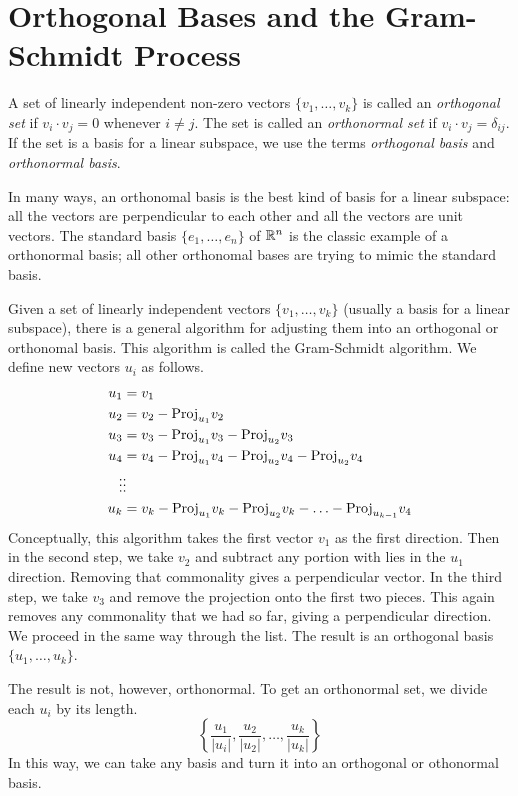 \documentclass[fleqn]{report}
\begin{document}
\section{Orthogonal Bases and the Gram-Schmidt Process}

\begin{defn}
A set of linearly independent non-zero vectors $\{ v_1,
\ldots, v_k\}$ is called an \emph{orthogonal set} if $v_i
\cdot v_j = 0$ whenever $i \neq j$. The set is called an
\emph{orthonormal set} if $v_i \cdot v_j = \delta_{ij}$. If
the set is a basis for a linear subspace, we use the terms
\emph{orthogonal basis} and \emph{orthonormal basis}.
\end{defn}

In many ways, an orthonomal basis is the best kind of basis
for a linear subspace: all the vectors are perpendicular to
each other and all the vectors are unit vectors. The standard
basis $\{e_1, \ldots, e_n\}$ of $\mathbb{R}^n$ is the classic example
of a orthonormal basis; all other orthonomal bases are trying
to mimic the standard basis.

Given a set of linearly independent vectors $\{v_1, \ldots,
v_k\}$ (usually a basis for a linear subspace), there is a
general algorithm for adjusting them into an orthogonal or
orthonomal basis. This algorithm is called the Gram-Schmidt
algorithm. We define new vectors $u_i$ as follows.
\begin{align*}
u_1 & = v_1 \\
u_2 & = v_2 - \mathrm{Proj}_{u_1} v_2 \\
u_3 & = v_3 - \mathrm{Proj}_{u_1} v_3 - \mathrm{Proj}_{u_2} v_3 \\
u_4 & = v_4 - \mathrm{Proj}_{u_1} v_4 - \mathrm{Proj}_{u_2} v_4 - \mathrm{Proj}_{u_2} v_4 \\
\vdots & \vdots \\
u_k & = v_k - \mathrm{Proj}_{u_1} v_k - \mathrm{Proj}_{u_2} v_k - \ldots -
\mathrm{Proj}_{u_{k-1}} v_4 
\end{align*}
Conceptually, this algorithm takes the first vector $v_1$ as
the first direction. Then in the second step, we take $v_2$
and subtract any portion with lies in the $u_1$ direction.
Removing that commonality gives a perpendicular vector. In
the third step, we take $v_3$ and remove the projection onto
the first two pieces. This again removes any commonality that
we had so far, giving a perpendicular direction. We proceed
in the same way through the list. The result is an orthogonal
basis $\{u_1, \ldots, u_k\}$. 

The result is not, however, orthonormal. To get an
orthonormal set, we divide each $u_i$ by its length.
\begin{equation*}
\left\{ \frac{u_1}{|u_i|}, \frac{u_2}{|u_2|}, \ldots,
\frac{u_k}{|u_k|} \right\}
\end{equation*}
In this way, we can take any basis and turn it into an
orthogonal or othonormal basis. 
\end{document}
